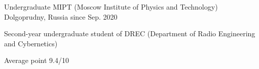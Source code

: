 
\begin{cventries}

  \cventry
    {Undergraduate} %
    {MIPT (Moscow Institute of Physics and Technology)} %
    {Dolgoprudny, Russia} %
    {since Sep. 2020} %
    {
      \begin{cvitems} %
        \item {Second-year undergraduate student of DREC (Department of Radio Engineering and Cybernetics)}
        \item {Average point 9.4/10}
      \end{cvitems}
    }

\end{cventries}
